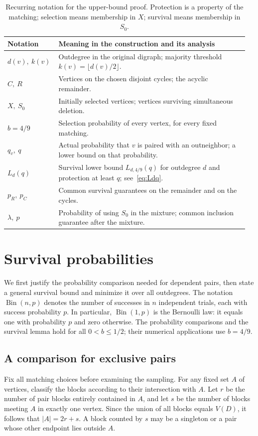 \documentclass[12pt]{article}
\DeclareMathOperator{\Bin}{Bin}
\newcommand{\floor}[1]{\lfloor #1\rfloor}
\newcommand{\abs}[1]{|#1|}
\begin{document}
\begin{table}[!ht]
\centering
\small
\renewcommand{\arraystretch}{1.16}
\begin{tabular}{@{}p{0.19\linewidth}p{0.77\linewidth}@{}}
\toprule
Notation & Meaning in the construction and its analysis \\
\midrule
\(d(v),\ k(v)\) & Outdegree in the original digraph; majority threshold \(k(v)=\floor{d(v)/2}\). \\
\(C,\ R\) & Vertices on the chosen disjoint cycles; the acyclic remainder. \\
\(X,\ S_0\) & Initially selected vertices; vertices surviving simultaneous deletion. \\
\(b=4/9\) & Selection probability of every vertex, for every fixed matching. \\
\(q_v,\ q\) & Actual probability that \(v\) is paired with an outneighbor; a lower bound on that probability. \\
\(L_d(q)\) & Survival lower bound \(L_{d,4/9}(q)\) for outdegree \(d\) and protection at least \(q\); see~\eqref{eq:Ldq}. \\
\(p_R,\ p_C\) & Common survival guarantees on the remainder and on the cycles. \\
\(\lambda,\ p\) & Probability of using \(S_0\) in the mixture; common inclusion guarantee after the mixture. \\
\bottomrule
\end{tabular}
\caption{Recurring notation for the upper-bound proof. Protection is a property of the matching; selection means membership in \(X\); survival means membership in \(S_0\).}
\label{tab:notation}
\end{table}
\FloatBarrier

\section{Survival probabilities}
\label{sec:analysis}

We first justify the probability comparison needed for dependent pairs, then state a general survival bound and minimize it over all outdegrees. The notation \(\Bin(n,p)\) denotes the number of successes in \(n\) independent trials, each with success probability \(p\). In particular, \(\Bin(1,p)\) is the Bernoulli law: it equals one with probability \(p\) and zero otherwise. The probability comparisons and the survival lemma hold for all \(0<b\le1/2\); their numerical applications use \(b=4/9\).

\subsection{A comparison for exclusive pairs}\label{sec:paircomparison}
Fix all matching choices before examining the sampling. For any fixed set \(A\) of vertices, classify the blocks according to their intersection with \(A\). Let \(r\) be the number of pair blocks entirely contained in \(A\), and let \(s\) be the number of blocks meeting \(A\) in exactly one vertex. Since the union of all blocks  equals $V(D)$,  it follows that \(\abs A=2r+s\). A block counted by \(s\) may be a singleton or a pair whose other endpoint lies outside \(A\).
\end{document}
